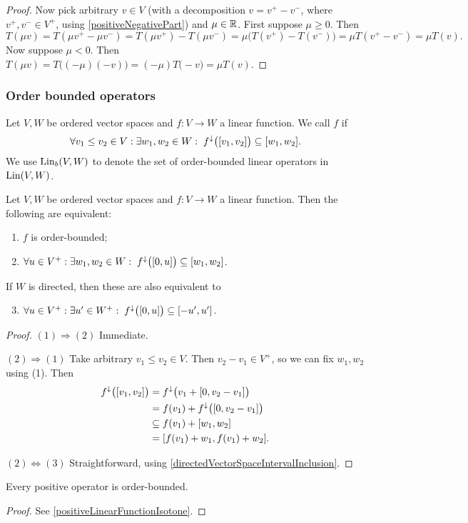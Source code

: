 \begin{proof}
Now pick arbitrary $v\in V$ (with a decomposition $v= v^+ - v^-$, where $v^+, v^-\in V^+$, using \ref{positiveNegativePart}) and $\mu\in \mathbb{R}$. First suppose $\mu \geq 0$. Then
\[ T(\mu v) = T(\mu v^+ - \mu v^-) = T(\mu v^+) - T(\mu v^-) = \mu \big(T(v^+) - T(v^-)\big) = \mu T(v^+ - v^-) = \mu T(v). \]
Now suppose $\mu < 0$. Then $T(\mu v) = T\big((-\mu)(-v)\big) = (-\mu)T\big(-v\big) = \mu T(v)$.
\end{proof}

\subsubsection{Order bounded operators}
\begin{definition}
Let $V,W$ be ordered vector spaces and $f: V\to W$ a linear function. We call $f$  if
\[ \forall v_1 \leq v_2\in V: \exists w_1,w_2\in W: \; f^\imf\big(\interval{v_1, v_2}\big) \subseteq \interval{w_1, w_2}.  \]
We use $\operatorname{Lin}_b(V,W)$ to denote the set of order-bounded linear operators in $\operatorname{Lin}(V,W)$.
\end{definition}


\begin{lemma} \label{orderBoundedEquivalents}
Let $V,W$ be ordered vector spaces and $f: V\to W$ a linear function. Then the following are equivalent:
\begin{enumerate}
\item $f$ is order-bounded;
\item $\forall u\in V^+: \exists w_1,w_2\in W: \; f^\imf\big(\interval{0,u}\big) \subseteq \interval{w_1,w_2}$.
\end{enumerate}
If $W$ is directed, then these are also equivalent to
\begin{enumerate} \setcounter{enumi}{2}
\item $\forall u\in V^+: \exists u'\in W^+: \; f^\imf\big(\interval{0,u}\big) \subseteq \interval{-u',u'}$.
\end{enumerate}
\end{lemma}
\begin{proof}
$(1) \Rightarrow (2)$ Immediate.

$(2) \Rightarrow (1)$ Take arbitrary $v_1 \leq v_2\in V$. Then $v_2 - v_1 \in V^+$, so we can fix $w_1,w_2$ using (1). Then
\begin{align*}
f^\imf\big(\interval{v_1, v_2}\big) &= f^\imf\big(v_1 + \interval{0, v_2-v_1}\big) \\
&= f(v_1) + f^\imf\big(\interval{0, v_2-v_1}\big) \\
&\subseteq f(v_1) + \interval{w_1,w_2} \\
&= \interval{f(v_1) + w_1, f(v_1) + w_2}.
\end{align*}

$(2) \Leftrightarrow (3)$ Straightforward, using \ref{directedVectorSpaceIntervalInclusion}.
\end{proof}
\begin{corollary}
Every positive operator is order-bounded.
\end{corollary}
\begin{proof}
See \ref{positiveLinearFunctionIsotone}.
\end{proof}

